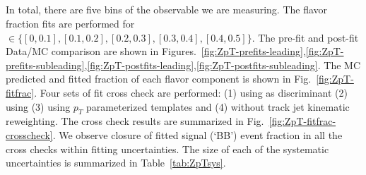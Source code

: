 \clearpage
\subsection{\zpt}

In total, there are five bins of the \zpt observable we are measuring. The flavor fraction fits are performed for \zpt $\in\{[0, 0.1], [0.1, 0.2], [0.2, 0.3], [0.3,0.4], [0.4,0.5]\}$. The pre-fit and post-fit Data/MC comparison are shown in Figures.~\ref{fig:ZpT-prefits-leading},\ref{fig:ZpT-prefits-subleading},\ref{fig:ZpT-postfits-leading},\ref{fig:ZpT-postfits-subleading}. The MC predicted and fitted fraction of each flavor component is shown in Fig.~\ref{fig:ZpT-fitfrac}. Four sets of fit cross check are performed: (1) using \sdzero as discriminant (2) using \subsubsdzero (3) using $p_T$ parameterized templates and (4) without track jet kinematic reweighting. The cross check results are summarized in Fig.~\ref{fig:ZpT-fitfrac-crosscheck}. We observe closure of fitted signal (`BB') event fraction in all the cross checks within fitting uncertainties. The size of each of the systematic uncertainties is summarized in Table~\ref{tab:ZpTsys}.


